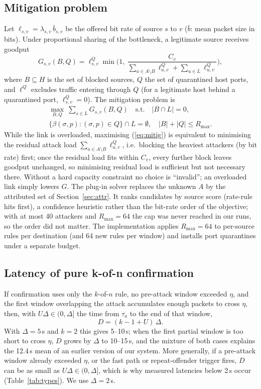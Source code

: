 \documentclass[conference]{IEEEtran}
\begin{document}
\subsection{Mitigation problem}
Let $\ell_{s,v}=\lambda_{s,v}\,\bar b_{s,v}$ be the offered bit rate of source $s$ to $v$ ($\bar b$: mean packet size in bits). Under proportional sharing of the bottleneck, a legitimate source receives goodput
\begin{equation}
G_{s,v}(B,Q)=\ell^{Q}_{s,v}\min\!\Big(1,\ \frac{C_v}{\sum_{a\in A\setminus B}\ell^{Q}_{a,v}+\sum_{u\in L}\ell^{Q}_{u,v}}\Big),
\end{equation}
where $B\subseteq H$ is the set of blocked sources, $Q$ the set of quarantined host ports, and $\ell^Q$ excludes traffic entering through $Q$ (for a legitimate host behind a quarantined port, $\ell^Q_{s,v}=0$). The mitigation problem is
\begin{multline}
\max_{B,Q}\ \sum_{s\in L}G_{s,v}(B,Q)\quad\text{s.t.}\quad |B\cap L|=0,\\
\{\beta(\sigma,p):(\sigma,p)\in Q\}\cap L=\emptyset,\quad |B|+|Q|\le R_{\max}. \label{eq:mitig}
\end{multline}
While the link is overloaded, maximising (\ref{eq:mitig}) is equivalent to minimising the residual attack load $\sum_{a\in A\setminus B}\ell^{Q}_{a,v}$, i.e.\ blocking the heaviest attackers (by bit rate) first; once the residual load fits within $C_v$, every further block leaves goodput unchanged, so minimising residual load is sufficient but not necessary there. Without a hard capacity constraint no choice is ``invalid''; an overloaded link simply lowers $G$. The plug-in solver replaces the unknown $A$ by the attributed set of Section~\ref{sec:attr}. It ranks candidates by source score (rate-rule hits first), a confidence heuristic rather than the bit-rate order of the objective; with at most 40 attackers and $R_{\max}=64$ the cap was never reached in our runs, so the order did not matter. The implementation applies $R_{\max}=64$ to per-source rules per destination (and 64 new rules per window) and installs port quarantines under a separate budget.

\subsection{Latency of pure k-of-n confirmation}
If confirmation uses only the $k$-of-$n$ rule, no pre-attack window exceeded $\eta$, and the first window overlapping the attack accumulates enough packets to cross $\eta$, then, with $U\Delta\in(0,\Delta]$ the time from $\tau_a$ to the end of that window,
\begin{equation}
D=(k-1+U)\,\Delta. \label{eq:lat}
\end{equation}
With $\Delta=5$\,s and $k=2$ this gives 5--10\,s; when the first partial window is too short to cross $\eta$, $D$ grows by $\Delta$ to 10--15\,s, and the mixture of both cases explains the 12.4\,s mean of an earlier version of our system. More generally, if a pre-attack window already exceeded $\eta$, or the fast path or repeat-offender trigger fires, $D$ can be as small as $U\Delta\in(0,\Delta]$, which is why measured latencies below 2\,s occur (Table~\ref{tab:types}). We use $\Delta=2$\,s.
\end{document}
